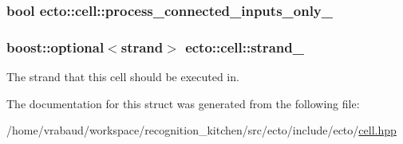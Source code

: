 \subsubsection[{process\+\_\+connected\+\_\+inputs\+\_\+only\+\_\+}]{\setlength{\rightskip}{0pt plus 5cm}bool ecto\+::cell\+::process\+\_\+connected\+\_\+inputs\+\_\+only\+\_\+\hspace{0.3cm}{\ttfamily [private]}}\label{structecto_1_1cell_a9a9d7fa3bb72fd74073a997bfb6cbad8}
\hypertarget{structecto_1_1cell_ada052f06257277c1b53c82226dff5821}{}
\subsubsection[{strand\+\_\+}]{\setlength{\rightskip}{0pt plus 5cm}boost\+::optional$<${\bf strand}$>$ ecto\+::cell\+::strand\+\_\+}\label{structecto_1_1cell_ada052f06257277c1b53c82226dff5821}


The strand that this cell should be executed in. 



The documentation for this struct was generated from the following file\+:\begin{DoxyCompactItemize}
\item 
/home/vrabaud/workspace/recognition\+\_\+kitchen/src/ecto/include/ecto/\hyperlink{cell_8hpp}{cell.\+hpp}\end{DoxyCompactItemize}
